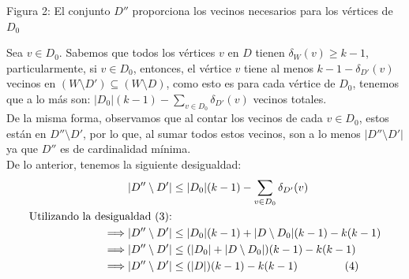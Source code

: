 \documentclass{article}
\begin{document}
\begin{center}
\begin{tikzpicture}[scale=1.2]
    
    
    
    
    

\end{tikzpicture}

\vspace{0.5cm}
Figura 2: \small{El conjunto $D''$ proporciona los vecinos necesarios para los vértices de $D_0$}

\end{center}


Sea $v\in D_0$. Sabemos que todos los vértices $v$ en $D$ tienen $\delta_W(v)\geq k-1$, particularmente, si $v\in D_0$, entonces, el vértice $v$ tiene al menos $k-1-\delta_{D'}(v)$ vecinos en $(W\setminus D')\subseteq (W\setminus D)$, como esto es para cada vértice de $D_0$, tenemos que a lo más son: $|D_0|(k-1)-\sum_{v\in D_0}\delta_{D'}(v)$ vecinos totales. \\
De la misma forma, observamos que al contar los vecinos de cada $v\in D_0$, estos están en $D''\setminus D'$, por lo que, al sumar todos estos vecinos, son a lo menos $|D''\setminus D'|$ ya que $D''$ es de cardinalidad mínima.\\

De lo anterior, tenemos la siguiente desigualdad:\\

\begin{align*}
|D''\setminus D'|&\leq |D_0|(k-1)-\sum_{v\in D_0}\delta_{D'}(v)\\
\text{Utilizando la desigualdad (3):}\\
\Longrightarrow|D''\setminus D'|&\leq |D_0|(k-1)+|D\setminus D_0|(k-1)-k(k-1)\\
\Longrightarrow|D''\setminus D'|&\leq (|D_0|+|D\setminus D_0|)(k-1)-k(k-1)\\
\Longrightarrow|D''\setminus D'|&\leq (|D|)(k-1)-k(k-1) \hspace{1.5cm} (4)\\
\end{align*}
\end{document}
